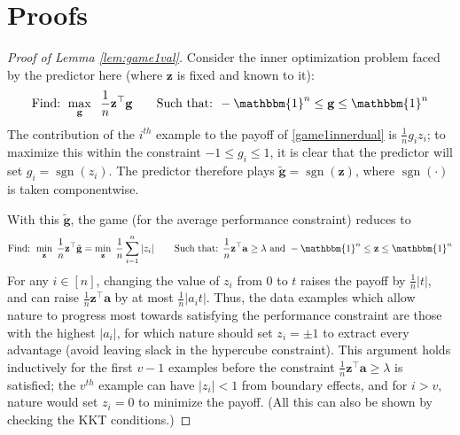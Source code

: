 \documentclass{article}[12pt]
\theoremstyle{named}
\newcommand{\ones}[1]{\mathbbm{1}^{#1}}
\newcommand{\va}{\mathbf{a}}
\newcommand{\vg}{\mathbf{g}}    %
\newcommand{\vz}{\mathbf{z}}
\DeclareMathOperator{\sgn}{sgn}
\newcommand{\abs}[1]{\left| #1 \right|}
\begin{document}



{}



\appendix
\newpage

\section{Proofs}
\label{sec:proofs}

\begin{proof}[Proof of Lemma \ref{lem:game1val}]
Consider the inner optimization problem faced by the predictor here 
(where $\vz$ is fixed and known to it):
\begin{align}
\label{game1innerdual}
\mbox{Find: } \displaystyle \max_{\vg} \;\; \frac{1}{n} \vz^\top \vg \;\;\;\;\;\;\; \mbox{Such that: } -\ones{n} \leq \vg \leq \ones{n}
\end{align} 
The contribution of the $i^{th}$ example to the payoff of \eqref{game1innerdual} is $\frac{1}{n} g_i z_i$; 
to maximize this within the constraint $-1 \leq g_i \leq 1$, 
it is clear that the predictor will set $g_i = \sgn(z_i)$. 
The predictor therefore plays $\tilde{\vg} = \sgn(\vz)$, where $\sgn(\cdot)$ is taken componentwise.

With this $\tilde{\vg}$,
the game (for the average performance constraint) reduces to
\begin{eqnarray}
\label{game1outerdual}
\mbox{Find: } \displaystyle \min_{\vz} \; \frac{1}{n} \vz^\top \tilde{\vg} 
= \min_{\vz} \; \frac{1}{n} \sum_{i=1}^n \abs{z_i} \;\;\;\;\;\;\; \mbox{Such that: } 
\frac{1}{n} \vz^\top \va \geq \lambda \mbox{ and } -\ones{n} \leq \vz \leq \ones{n} 
\end{eqnarray}
For any $i \in [n]$, 
changing the value of $z_i$ from $0$ to $t$ raises the payoff by $\frac{1}{n} \abs{t}$, 
and can raise $\frac{1}{n} \vz^\top \va$ by at most $\frac{1}{n} \abs{a_i t}$. 
Thus, the data examples which allow nature to progress most towards satisfying the performance constraint are those with the highest $\abs{a_i}$, 
for which nature should set $z_i = \pm 1$ to extract every advantage 
(avoid leaving slack in the hypercube constraint). 
This argument holds inductively for the first $v-1$ examples before the constraint $\frac{1}{n} \vz^\top \va \geq \lambda$ is satisfied; 
the $v^{th}$ example can have $\abs{z_i} < 1$ from boundary effects, 
and for $i > v$, nature would set $z_i = 0$ to minimize the payoff.
(All this can also be shown by checking the KKT conditions.)


\end{proof}
\end{document}
